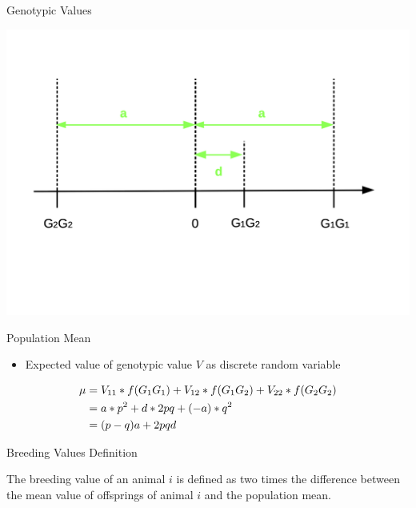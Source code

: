 \documentclass[ignorenonframetext,]{beamer}
\providecommand{\tightlist}{%
  \setlength{\itemsep}{0pt}\setlength{\parskip}{0pt}}
\begin{document}
\begin{frame}{Genotypic Values}
\protect\hypertarget{genotypic-values}{}

\includegraphics{odg/genotypicvalue.png}

\end{frame}

\begin{frame}{Population Mean}
\protect\hypertarget{population-mean}{}

\begin{itemize}
\tightlist
\item
  Expected value of genotypic value \(V\) as discrete random variable
\end{itemize}

\begin{align}
\mu &= V_{11} * f(G_1G_1) + V_{12} * f(G_1G_2) + V_{22} * f(G_2G_2) \notag \\
    &= a * p^2 + d *2pq + (-a) * q^2 \notag \\
    &= (p-q)a + 2pqd \notag
\end{align}

\end{frame}

\begin{frame}{Breeding Values Definition}
\protect\hypertarget{breeding-values-definition}{}

The breeding value of an animal \(i\) is defined as two times the
difference between the mean value of offsprings of animal \(i\) and the
population mean.

\end{frame}
\end{document}
